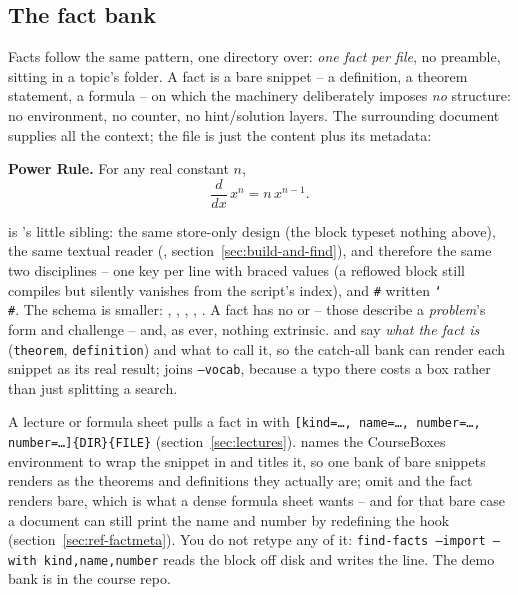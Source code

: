 \subsection{The fact bank}\label{sec:fact-files}

Facts follow the same pattern, one directory over: \emph{one fact per file},
no preamble, sitting in a topic's  folder. A fact is a bare
snippet -- a definition, a theorem statement, a formula -- on which the
machinery deliberately imposes \emph{no} structure: no environment, no
counter, no hint/solution layers. The surrounding document supplies all the
context; the file is just the content plus its metadata:

\begin{manexample}
\textbf{Power Rule.}\quad
For any real constant $n$,
\[ \frac{d}{dx}\,x^{n} = n\,x^{n-1}. \]
\end{manexample}

 is 's little sibling: the same store-only
design (the block typeset nothing above), the same textual reader
(, section~\ref{sec:build-and-find}), and therefore the same
two disciplines -- one key per line with braced values (a reflowed block
still compiles but silently vanishes from the script's index), and
\texttt{\#} written \texttt{\char`\\\#}. The schema is smaller: ,
, , , . A fact has
no  or  -- those describe a \emph{problem}'s form
and challenge -- and, as ever, nothing extrinsic.  and 
say \emph{what the fact is} (\texttt{theorem}, \texttt{definition}) and what
to call it, so the catch-all bank can render each snippet as its real
result;  joins \texttt{--vocab}, because a typo there costs a box
rather than just splitting a search.

A lecture or formula sheet pulls a fact in with
\texttt{[kind=\dots, name=\dots, number=\dots,
number=\dots]\{DIR\}\{FILE\}} (section~\ref{sec:lectures}).  names
the CourseBoxes environment to wrap the snippet in and  titles it,
so one bank of bare snippets renders as the theorems and definitions they
actually are; omit  and the fact renders bare, which is what a
dense formula sheet wants -- and for that bare case a document can still print
the name and number by redefining the  hook
(section~\ref{sec:ref-factmeta}). You do not retype any of it:
\texttt{find-facts --import --with kind,name,number} reads the block off
disk and writes the line. The demo bank is  in the
course repo.

